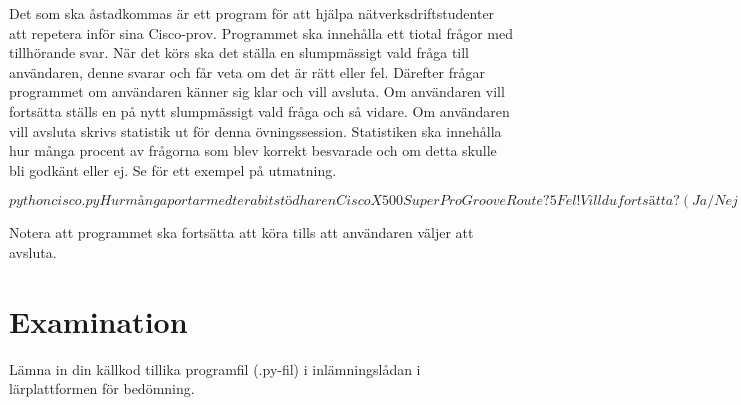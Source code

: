 \documentclass[a4paper]{miunasgn}
\begin{document}
Det som ska åstadkommas är ett program för att hjälpa nätverksdriftstudent\-er 
att repetera inför sina Cisco-prov.
Programmet ska innehålla ett tiotal frågor med tillhörande svar.
När det körs ska det ställa en slumpmässigt vald fråga till användaren, denne 
svarar och får veta om det är rätt eller fel.
Därefter frågar programmet om användaren känner sig klar och vill 
avsluta.
Om användaren vill fortsätta ställs en på nytt slumpmässigt vald fråga och så 
vidare.
Om användaren vill avsluta skrivs statistik ut för denna övningssession.
Statistiken ska innehålla hur många procent av frågorna som blev korrekt 
besvarade och om detta skulle bli godkänt eller ej.
Se  för ett exempel på utmatning.

\begin{terminal}[float,label={lst:output},caption={Exempel på utmatning från 
  programmet.}]
$ python cisco.py
Hur många portar med terabitstöd har en Cisco X500 SuperPro GrooveRoute?
5
Fel!
Vill du fortsätta? (Ja/Nej)
Ja
Vad heter Ciscos nuvarande VD?
Rutger Blinka
Fel!
Vill du fortsätta? (Ja/Nej)
Nej
Du hade 0%
$
\end{terminal}

Notera att programmet ska fortsätta att köra tills att användaren väljer att 
avsluta.


\section{Examination}
\label{sec:exam}
Lämna in din källkod tillika programfil (.py-fil) i inlämningslådan 
i lärplattform\-en för bedömning.


\printbibliography
\end{document}

